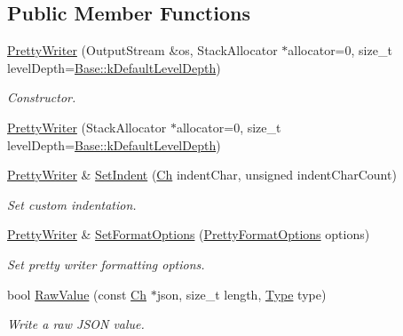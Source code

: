 \subsection*{Public Member Functions}
\begin{DoxyCompactItemize}
\item 
\mbox{\hyperlink{classrapidjson_1_1_pretty_writer_a688d7ebf5c8015e423b7a970afc8e0a0}{Pretty\+Writer}} (Output\+Stream \&os, Stack\+Allocator $\ast$allocator=0, size\+\_\+t level\+Depth=\mbox{\hyperlink{classrapidjson_1_1_writer_a9acc453af3bfddea0bf001e022ae411c}{Base\+::k\+Default\+Level\+Depth}})
\begin{DoxyCompactList}\small\item\em Constructor. \end{DoxyCompactList}\item 
\mbox{\hyperlink{classrapidjson_1_1_pretty_writer_a2872cf0f442e07fd823846432c0d3923}{Pretty\+Writer}} (Stack\+Allocator $\ast$allocator=0, size\+\_\+t level\+Depth=\mbox{\hyperlink{classrapidjson_1_1_writer_a9acc453af3bfddea0bf001e022ae411c}{Base\+::k\+Default\+Level\+Depth}})
\item 
\mbox{\hyperlink{classrapidjson_1_1_pretty_writer}{Pretty\+Writer}} \& \mbox{\hyperlink{classrapidjson_1_1_pretty_writer_a121686c29ca7fe071fa4108c46955ff0}{Set\+Indent}} (\mbox{\hyperlink{classrapidjson_1_1_pretty_writer_a74a38902073aa599c8bcc6a3ca6126d0}{Ch}} indent\+Char, unsigned indent\+Char\+Count)
\begin{DoxyCompactList}\small\item\em Set custom indentation. \end{DoxyCompactList}\item 
\mbox{\hyperlink{classrapidjson_1_1_pretty_writer}{Pretty\+Writer}} \& \mbox{\hyperlink{classrapidjson_1_1_pretty_writer_acde6176577f29869e28a4f3c4a251090}{Set\+Format\+Options}} (\mbox{\hyperlink{namespacerapidjson_a084b31753ef2edefdeca8a5374eccc4b}{Pretty\+Format\+Options}} options)
\begin{DoxyCompactList}\small\item\em Set pretty writer formatting options. \end{DoxyCompactList}\item 
bool \mbox{\hyperlink{classrapidjson_1_1_pretty_writer_a3136e3426a5d06e5da50f6e6aab8a5be}{Raw\+Value}} (const \mbox{\hyperlink{classrapidjson_1_1_pretty_writer_a74a38902073aa599c8bcc6a3ca6126d0}{Ch}} $\ast$json, size\+\_\+t length, \mbox{\hyperlink{namespacerapidjson_ae79a4751c1c460ff0de5ecc07874f3e4}{Type}} type)
\begin{DoxyCompactList}\small\item\em Write a raw J\+S\+ON value. \end{DoxyCompactList}\end{DoxyCompactItemize}
